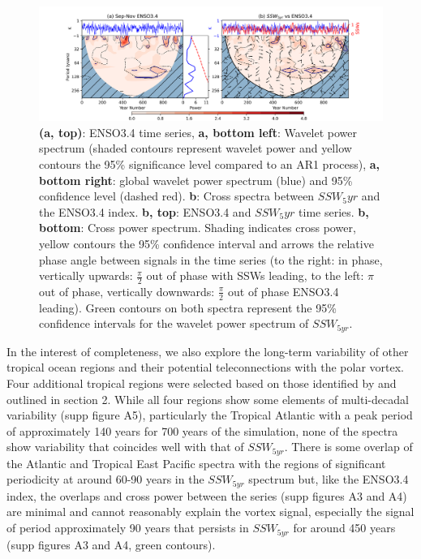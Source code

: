 \begin{figure}[h!]
\begin{center}
\noindent\includegraphics[width = \linewidth]{Figures/Figures-origins/ENSO_wavelet_combined.png}
\caption{\textbf{(a, top)}: ENSO3.4 time series, \textbf{a, bottom left}: Wavelet power spectrum (shaded contours represent wavelet power and yellow contours the 95\% significance level compared to an AR1 process), \textbf{a, bottom right}: global wavelet power spectrum (blue) and 95\% confidence level (dashed red). \textbf{b}: Cross spectra between $SSW_5yr$ and the ENSO3.4 index. \textbf{b, top}: ENSO3.4 and $SSW_5yr$ time series. \textbf{b, bottom}: Cross power spectrum. Shading indicates cross power, yellow contours the 95\% confidence interval and arrows the relative phase angle between signals in the time series (to the right: in phase, vertically upwards: $\frac{\pi}{2}$ out of phase with SSWs leading, to the left: $\pi$ out of phase, vertically downwards: $\frac{\pi}{2}$ out of phase ENSO3.4 leading). Green contours on both spectra represent the 95\% confidence intervals for the wavelet power spectrum of $SSW_{5yr}$.}
\label{fig:ENSO_wavelet}
\end{center}
\end{figure}

In the interest of completeness, we also explore the long-term variability of other tropical ocean regions and their potential teleconnections with the polar vortex. Four additional tropical regions were selected based on those identified by \cite{Scaife2016} and outlined in section 2. While all four regions show some elements of multi-decadal variability (supp figure A5), particularly the Tropical Atlantic with a peak period of approximately 140 years for 700 years of the simulation, none of the spectra show variability that coincides well with that of $SSW_{5yr}$. There is some overlap of the Atlantic and Tropical East Pacific spectra with the regions of significant periodicity at around 60-90 years in the $SSW_{5yr}$ spectrum but, like the ENSO3.4 index, the overlaps and cross power between the series (supp figures A3 and A4) are minimal and cannot reasonably explain the vortex signal, especially the signal of period approximately 90 years that persists in $SSW_{5yr}$ for around 450 years (supp figures A3 and A4, green contours).

